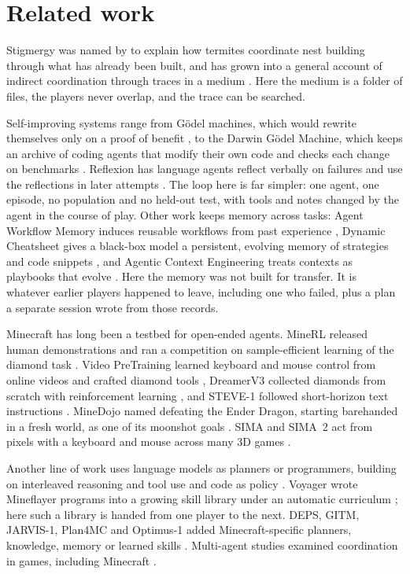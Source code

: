 \documentclass[11pt,a4paper]{article}
\begin{document}
\section{Related work}

Stigmergy was named by \citet{grasse1959} to explain how termites coordinate nest building through what has already been built, and has grown into a general account of indirect coordination through traces in a medium \citep{theraulaz1999,heylighen2016}. Here the medium is a folder of files, the players never overlap, and the trace can be searched.

Self-improving systems range from G\"odel machines, which would rewrite themselves only on a proof of benefit \citep{schmidhuber2003}, to the Darwin G\"odel Machine, which keeps an archive of coding agents that modify their own code and checks each change on benchmarks \citep{zhang2025dgm}. Reflexion has language agents reflect verbally on failures and use the reflections in later attempts \citep{shinn2023reflexion}. The loop here is far simpler: one agent, one episode, no population and no held-out test, with tools and notes changed by the agent in the course of play. Other work keeps memory across tasks: Agent Workflow Memory induces reusable workflows from past experience \citep{wang2024awm}, Dynamic Cheatsheet gives a black-box model a persistent, evolving memory of strategies and code snippets \citep{suzgun2025cheatsheet}, and Agentic Context Engineering treats contexts as playbooks that evolve \citep{zhang2025ace}. Here the memory was not built for transfer. It is whatever earlier players happened to leave, including one who failed, plus a plan a separate session wrote from those records.

Minecraft has long been a testbed for open-ended agents. MineRL released human demonstrations and ran a competition on sample-efficient learning of the diamond task \citep{guss2019minerl,guss2019competition}. Video PreTraining learned keyboard and mouse control from online videos and crafted diamond tools \citep{baker2022vpt}, DreamerV3 collected diamonds from scratch with reinforcement learning \citep{hafner2025dreamer}, and STEVE-1 followed short-horizon text instructions \citep{lifshitz2023steve}. MineDojo named defeating the Ender Dragon, starting barehanded in a fresh world, as one of its moonshot goals \citep{fan2022minedojo}. SIMA and SIMA~2 act from pixels with a keyboard and mouse across many 3D games \citep{sima2024,sima2025}.

Another line of work uses language models as planners or programmers, building on interleaved reasoning and tool use \citep{yao2023react} and code as policy \citep{liang2023code}. Voyager wrote Mineflayer programs into a growing skill library under an automatic curriculum \citep{wang2024voyager}; here such a library is handed from one player to the next. DEPS, GITM, JARVIS-1, Plan4MC and Optimus-1 added Minecraft-specific planners, knowledge, memory or learned skills \citep{wang2023deps,zhu2023gitm,wang2025jarvis,yuan2023plan4mc,li2024optimus}. Multi-agent studies examined coordination in games, including Minecraft \citep{gong2024mindagent,altera2024sid,white2025collaborating}.
\end{document}
